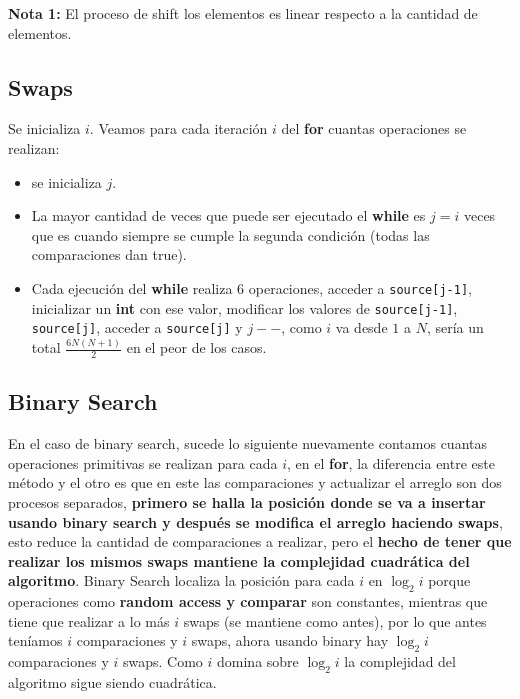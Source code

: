 \documentclass[14pt]{extarticle}
\begin{document}
\textbf{Nota 1:} El proceso de shift los elementos es linear respecto a la cantidad de elementos.

\subsection{Swaps}

Se inicializa $i$.  Veamos para cada iteración $i$ del \textbf{for} cuantas operaciones se realizan:

\begin{itemize}
    \item se inicializa $j$.
    \item La mayor cantidad de veces que puede ser ejecutado el \textbf{while} es $j=i$ veces que es cuando siempre se cumple la segunda condición (todas las comparaciones dan true).
    \item Cada ejecución del \textbf{while} realiza 6 operaciones, acceder a \texttt{source[j-1]}, inicializar un \textbf{int} con ese valor, modificar los valores de \texttt{source[j-1]}, \texttt{source[j]}, acceder a \texttt{source[j]} y $j--$, como $i$ va desde $1$ a $N$, sería un total $\frac{6N(N+1)}{2}$ en el peor de los casos.
\end{itemize}

\subsection{Binary Search}
En el caso de binary search, sucede lo siguiente nuevamente contamos cuantas operaciones primitivas se realizan para cada $i$, en el \textbf{for}, la diferencia entre este método y el otro es que en este las comparaciones y actualizar el arreglo son dos procesos separados, \textbf{primero se halla la posición donde se va a insertar usando binary search y después se modifica el arreglo haciendo swaps}, esto reduce la cantidad de comparaciones a realizar, pero el \textbf{hecho de tener que realizar los mismos swaps mantiene la complejidad cuadrática del algoritmo}. Binary Search localiza la posición para cada $i$ en $\log_2{i}$ porque operaciones como \textbf{random access y comparar} son constantes, mientras que tiene que realizar a lo más $i$ swaps (se mantiene como antes), por lo que antes teníamos $i$ comparaciones y $i$ swaps, ahora usando binary hay $\log_2{i}$ comparaciones y $i$ swaps. Como $i$ domina sobre $\log_2{i}$ la complejidad del algoritmo sigue siendo cuadrática.

\begin{figure}[htbp]
  \centering
  
\end{figure}
\end{document}
